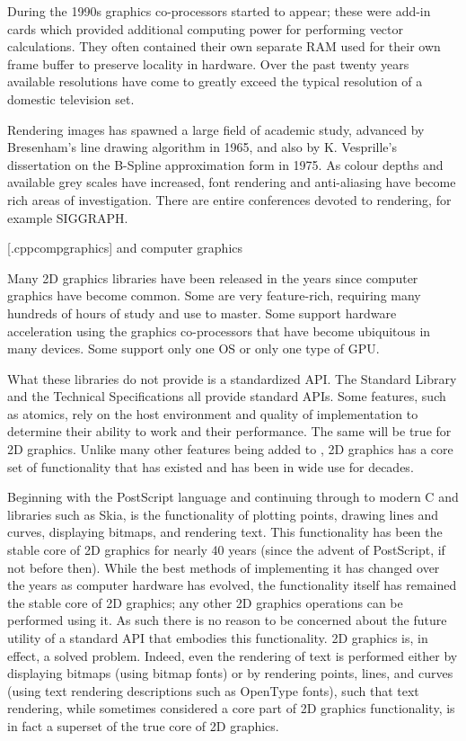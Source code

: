 \pnum
During the 1990s graphics co-processors started to appear; these were add-in cards which provided additional computing power for performing vector calculations. They often contained their own separate RAM used for their own frame buffer to preserve locality in hardware. Over the past twenty years available resolutions have come to greatly exceed the typical resolution of a domestic television set.

\pnum
Rendering images has spawned a large field of academic study, advanced by Bresenham’s line drawing algorithm in 1965, and also by K. Vesprille’s dissertation on the B-Spline approximation form in 1975. As colour depths and available grey scales have increased, font rendering and anti-aliasing have become rich areas of investigation. There are entire conferences devoted to rendering, for example SIGGRAPH.

[\iotwod.cppcompgraphics]{\Cpp{} and computer graphics}

\pnum
Many \Cpp{} 2D graphics libraries have been released in the years since computer graphics have become common. Some are very feature-rich, requiring many hundreds of hours of study and use to master. Some support hardware acceleration using the graphics co-processors that have become ubiquitous in many devices. Some support only one OS or only one type of GPU.

\pnum
What these libraries do not provide is a standardized \Cpp{} API. The \Cpp{} Standard Library and the \Cpp{} Technical Specifications all provide standard \Cpp{} APIs. Some features, such as atomics, rely on the host environment and quality of implementation to determine their ability to work and their performance. The same will be true for 2D graphics. Unlike many other features being added to \Cpp{}, 2D graphics has a core set of functionality that has existed and has been in wide use for decades.

\pnum
Beginning with the PostScript language and continuing through to modern C and \Cpp{} libraries such as Skia, is the functionality of plotting points, drawing lines and curves, displaying bitmaps, and rendering text. This functionality has been the stable core of 2D graphics for nearly 40 years (since the advent of PostScript, if not before then). While the best methods of implementing it has changed over the years as computer hardware has evolved, the functionality itself has remained the stable core of 2D graphics; any other 2D graphics operations can be performed using it. As such there is no reason to be concerned about the future utility of a standard \Cpp{} API that embodies this functionality. 2D graphics is, in effect, a solved problem. Indeed, even the rendering of text is performed either by displaying bitmaps (using bitmap fonts) or by rendering points, lines, and curves (using text rendering descriptions such as OpenType fonts), such that text rendering, while sometimes considered a core part of 2D graphics functionality, is in fact a superset of the true core of 2D graphics. 

